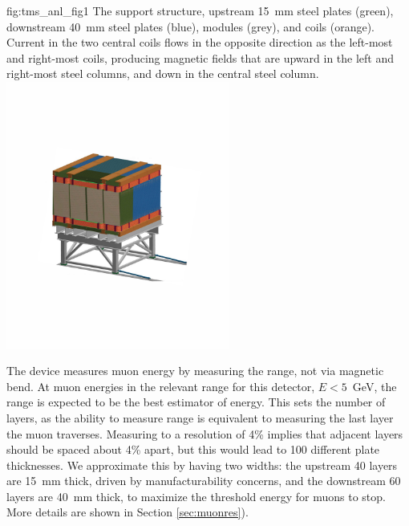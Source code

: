 \begin{dunefigure}{fig:tms_anl_fig1}
{The  support structure, upstream \SI{15}{\mm} steel plates (green), downstream \SI{40}{\mm} steel plates (blue), modules (grey), and coils (orange).  Current in the two central coils flows in the opposite direction as the left-most and right-most coils, producing magnetic fields that are upward in the left and right-most steel columns, and down in the central steel column.}
\includegraphics[width=0.55\textwidth]{graphics/tms/Detector/tms_anl_iso2.pdf}
\end{dunefigure}

The device measures muon energy by measuring the range, not via magnetic bend. At muon energies in the relevant range for this detector, $E < 5$~GeV, the range is expected to be the best estimator of energy. This sets the number of layers, as the ability to measure range is equivalent to measuring the last layer the muon traverses. Measuring to a resolution of 4\% implies that adjacent layers should be spaced about 4\% apart, but this would lead to \num{100} different plate thicknesses. We approximate this by having two widths: the upstream \num{40} layers are 15~mm thick, driven by manufacturability concerns, and the downstream \num{60} layers are 40~mm thick, to maximize the threshold energy for muons to stop. More details are shown in Section \ref{sec:muonres}).


